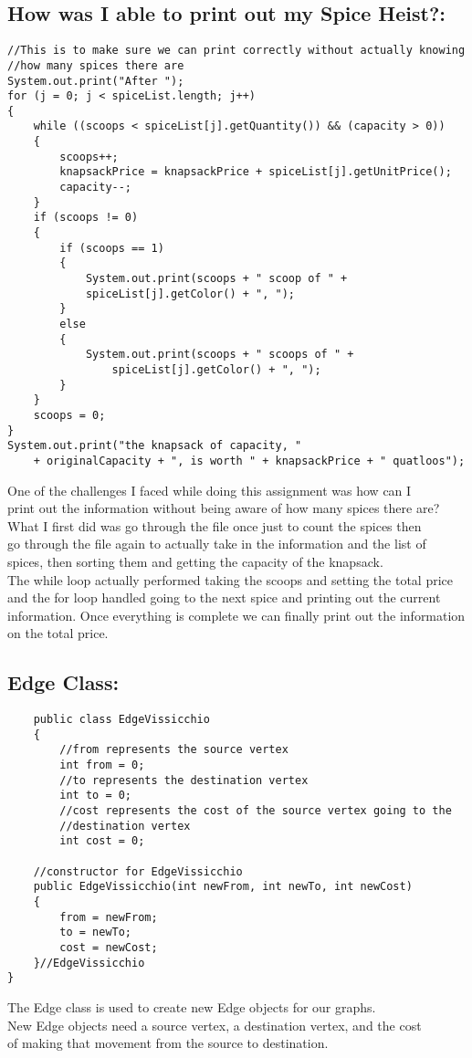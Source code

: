 \documentclass[letterpaper, 10pt]{article}
\begin{document}
\noindent
\subsection{How was I able to print out my Spice Heist?:}
\begin{lstlisting}
//This is to make sure we can print correctly without actually knowing 
//how many spices there are
System.out.print("After ");
for (j = 0; j < spiceList.length; j++)
{
    while ((scoops < spiceList[j].getQuantity()) && (capacity > 0))
    {
        scoops++;
        knapsackPrice = knapsackPrice + spiceList[j].getUnitPrice();
        capacity--;
    }
	if (scoops != 0)
	{
        if (scoops == 1)
		{
		    System.out.print(scoops + " scoop of " +
		    spiceList[j].getColor() + ", ");
		}
		else
		{
		    System.out.print(scoops + " scoops of " + 
		        spiceList[j].getColor() + ", ");
		}
	}
	scoops = 0;
}
System.out.print("the knapsack of capacity, " 
    + originalCapacity + ", is worth " + knapsackPrice + " quatloos");
\end{lstlisting}
\noindent
One of the challenges I faced while doing this assignment was how can I \\
print out the information without being aware of how many spices there are?\\
What I first did was go through the file once just to count the spices then\\
go through the file again to actually take in the information and the list of \\
spices, then sorting them and getting the capacity of the knapsack. \\
The while loop actually performed taking the scoops and setting the total price\\
and the for loop handled going to the next spice and printing out the current \\
information. Once everything is complete we can finally print out the  information on the total price.\\

\noindent
\subsection{Edge Class:}
\begin{lstlisting}
    public class EdgeVissicchio 
    {
        //from represents the source vertex
        int from = 0;
        //to represents the destination vertex
        int to = 0;
        //cost represents the cost of the source vertex going to the 
        //destination vertex
        int cost = 0;

    //constructor for EdgeVissicchio
	public EdgeVissicchio(int newFrom, int newTo, int newCost)
	{
		from = newFrom;
		to = newTo;
        cost = newCost;
	}//EdgeVissicchio    
}
\end{lstlisting}
\noindent
The Edge class is used to create new Edge objects for our graphs.\\
New Edge objects need a source vertex, a destination vertex, and the cost \\
of making that movement from the source to destination.
\end{document}
